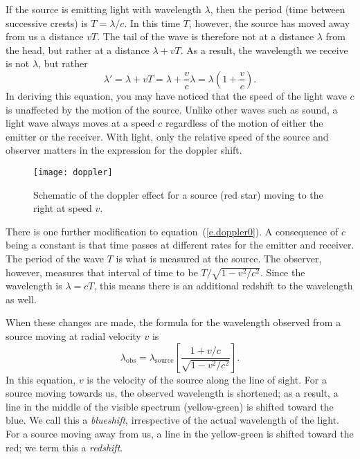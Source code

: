 If the source is emitting light with wavelength $\lambda$, then the period (time between successive crests) is $T = \lambda/c$.  In this time $T$, however, the source has moved away from us a distance $vT$. The tail of the wave is therefore not at a distance $\lambda$ from the head, but rather at a distance $\lambda + vT$.  As a result, the wavelength we receive is not $\lambda$, but rather
\begin{equation}\label{e.doppler0}
 \lambda' = \lambda + vT = \lambda + \frac{v}{c}\lambda = \lambda\left(1+\frac{v}{c}\right).
\end{equation}
In deriving this equation, you may have noticed that the speed of the light wave $c$ is unaffected by the motion of the source.  Unlike other waves such as sound, a light wave always moves at a speed $c$ regardless of the motion of either the emitter or the receiver. With light, only the relative speed of the source and observer matters in the expression for the doppler shift.

\begin{figure*}
\texttt{[image: doppler]}
\caption[Schematic of the doppler effect]{Schematic of the doppler effect for a source (red star) moving to the right at speed $v$.}
\label{f.doppler}
\end{figure*}

There is one further modification to equation~(\ref{e.doppler0}).
A consequence of $c$ being a constant is that time passes at different rates for the emitter and receiver.  The period of the wave $T$ is what is measured at the source.  The observer, however, measures that interval of time to be $T/\sqrt{1-v^{2}/c^{2}}$.  Since the wavelength is $\lambda = cT$, this means there is an additional redshift to the wavelength as well.

When these changes are made, the formula for the wavelength observed from a source moving at radial velocity $v$ is
\begin{equation}\label{e.doppler}
\lambda_{\mathrm{obs}} 
 = \lambda_{\mathrm{source}} \left[\frac{1+v/c}{\sqrt{1-v^{2}/c^{2}}}\right].
\end{equation}
In this equation, $v$ is the velocity of the source along the line of sight.
For a source moving towards us, the observed wavelength is shortened; as a result, a line in the middle of the visible spectrum (yellow-green) is shifted toward the blue.  We call this a \emph{blueshift}, irrespective of the actual wavelength of the light.  For a source moving away from us, a line in the yellow-green is shifted toward the red; we term this a \emph{redshift}.

